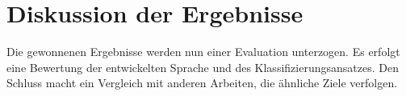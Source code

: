 \chapter{Diskussion der Ergebnisse}
    \label{chapter:FindingsDiscussion}
    Die gewonnenen Ergebnisse
    werden nun einer Evaluation unterzogen.
    Es erfolgt eine Bewertung der entwickelten Sprache
    und des Klassifizierungsansatzes.
    Den Schluss macht ein Vergleich mit anderen Arbeiten,
    die ähnliche Ziele verfolgen.

    
    
